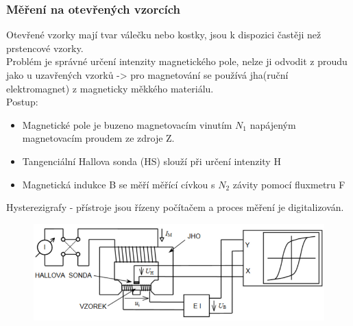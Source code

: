 \subsubsection{Měření na otevřených vzorcích}
Otevřené vzorky mají tvar válečku nebo kostky, jsou k dispozici častěji než prstencové vzorky.\\
Problém je správné určení intenzity magnetického pole, nelze ji odvodit z proudu jako u uzavřených vzorků -> pro magnetování se používá jha(ruční elektromagnet) z magneticky měkkého materiálu.\\
Postup:\\
\begin{itemize}
    \item Magnetické pole je buzeno magnetovacím vinutím \(N_1\) napájeným magnetovacím proudem ze zdroje Z.
    \item Tangenciální Hallova sonda (HS) slouží při určení intenzity H
    \item Magnetická indukce B se měří měřící cívkou s \(N_2\) závity pomocí fluxmetru F
\end{itemize}
Hysterezigrafy - přístroje jsou řízeny počítačem a proces měření je digitalizován.\\

\begin{figure}[h!]
    \centering
    \includegraphics[scale = 0.5]{images/MerOtevVzor.png}
\end{figure}